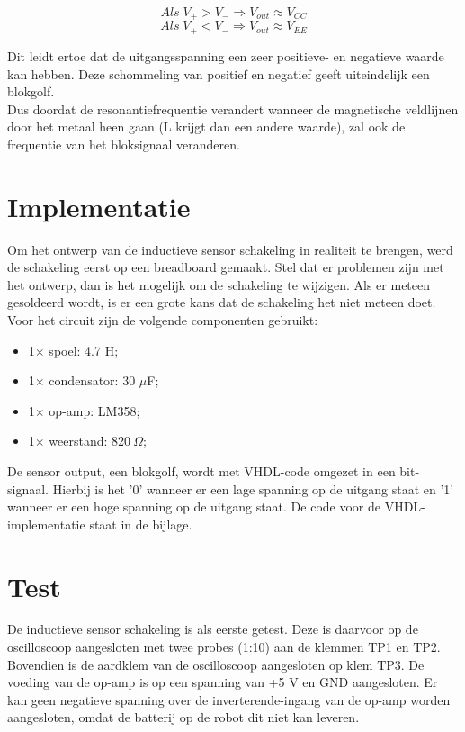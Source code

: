 \documentclass{report}
\begin{document}
\begin{equation}
Als \;V_+>V_- \Rightarrow V_{out}\approx V_{CC}
\end{equation}
\begin{equation}
Als \; V_+<V_- \Rightarrow V_{out}\approx V_{EE}
\end{equation}

Dit leidt ertoe dat de uitgangsspanning een zeer positieve- en negatieve waarde kan hebben. Deze schommeling van positief en negatief geeft uiteindelijk een blokgolf.\\

Dus doordat de resonantiefrequentie verandert wanneer de magnetische veldlijnen door het metaal heen gaan (L krijgt dan een andere waarde), zal ook de frequentie van het bloksignaal veranderen. 

\section{Implementatie}
Om het ontwerp van de inductieve sensor schakeling in realiteit te brengen, werd de schakeling eerst op een breadboard gemaakt. Stel dat er problemen zijn met het ontwerp, dan is het mogelijk om de schakeling te wijzigen. Als er meteen gesoldeerd wordt, is er een grote kans dat de schakeling het niet meteen doet.\\ 

\noindent Voor het circuit zijn de volgende componenten gebruikt:
\begin{itemize}
\item 1$\times$ spoel: 4.7 H;
\item 1$\times$ condensator: 30 $\mu$F;
\item 1$\times$ op-amp: LM358;
\item 1$\times$ weerstand: 820$\: \Omega$;
\end{itemize}

De sensor output, een blokgolf, wordt met VHDL-code omgezet in een bit-signaal. Hierbij is het '0' wanneer er een lage spanning op de uitgang staat en '1' wanneer er een hoge spanning op de uitgang staat. De code voor de VHDL-implementatie staat in de bijlage.

\section{Test}
De inductieve sensor schakeling is als eerste getest. Deze is daarvoor op de oscilloscoop aangesloten met twee probes (1:10) aan de klemmen TP1 en TP2. Bovendien is de aardklem van de oscilloscoop aangesloten op klem TP3. De voeding van de op-amp is op een spanning van +5 V en GND aangesloten. Er kan geen negatieve spanning over de inverterende-ingang van de op-amp worden aangesloten, omdat de batterij op de robot dit niet kan leveren. 
\end{document}
